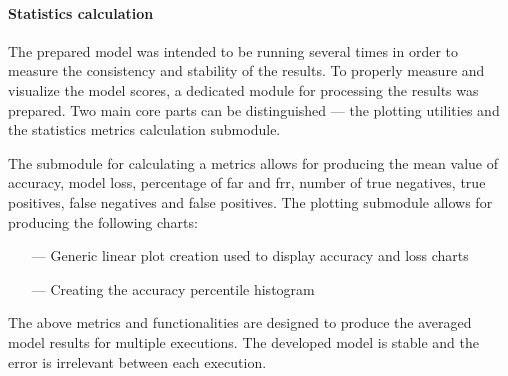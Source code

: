 \paragraph{Statistics calculation}\label{para:statistics-calculation}
The prepared model was intended to be running several times in order to measure the consistency and stability of the results.
To properly measure and visualize the model scores, a dedicated module for processing the results was prepared.
Two main core parts can be distinguished --- the plotting utilities and the statistics metrics calculation submodule.

The submodule for calculating a metrics allows for producing the mean value of accuracy, model loss, percentage of \gls{far} and \gls{frr}, number of true negatives, true positives, false negatives and false positives.
The plotting submodule allows for producing the following charts:
\begin{samepage}
    \begin{itemize}
        \item[---] Generic linear plot creation used to display accuracy and loss charts
        \item[---] Creating the accuracy percentile histogram
    \end{itemize}
\end{samepage}

The above metrics and functionalities are designed to produce the averaged model results for multiple executions.
The developed model is stable and the error is irrelevant between each execution.
